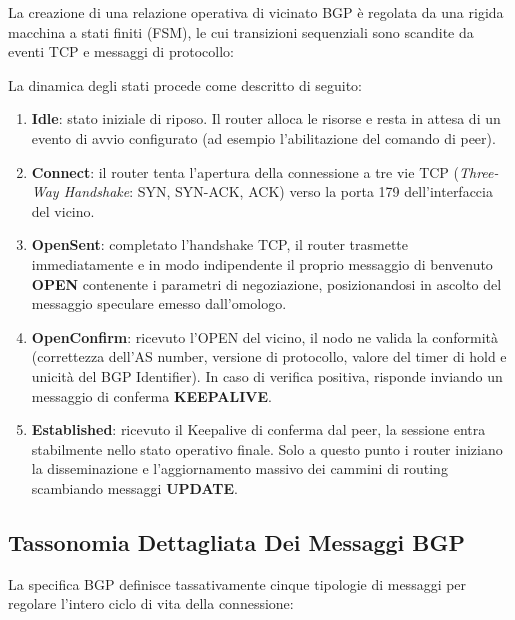\documentclass[11pt, a4paper]{article}
\begin{document}
La creazione di una relazione operativa di vicinato BGP è regolata da una rigida macchina a stati finiti (FSM), le cui transizioni sequenziali sono scandite da eventi TCP e messaggi di protocollo:


La dinamica degli stati procede come descritto di seguito:
\begin{enumerate}
    \item \textbf{Idle}: stato iniziale di riposo. Il router alloca le risorse e resta in attesa di un evento di avvio configurato (ad esempio l'abilitazione del comando di peer).
    \item \textbf{Connect}: il router tenta l'apertura della connessione a tre vie TCP (\emph{Three-Way Handshake}: SYN, SYN-ACK, ACK) verso la porta 179 dell'interfaccia del vicino.
    \item \textbf{OpenSent}: completato l'handshake TCP, il router trasmette immediatamente e in modo indipendente il proprio messaggio di benvenuto \textbf{OPEN} contenente i parametri di negoziazione, posizionandosi in ascolto del messaggio speculare emesso dall'omologo.
    \item \textbf{OpenConfirm}: ricevuto l'OPEN del vicino, il nodo ne valida la conformità (correttezza dell'AS number, versione di protocollo, valore del timer di hold e unicità del BGP Identifier). In caso di verifica positiva, risponde inviando un messaggio di conferma \textbf{KEEPALIVE}.
    \item \textbf{Established}: ricevuto il Keepalive di conferma dal peer, la sessione entra stabilmente nello stato operativo finale. Solo a questo punto i router iniziano la disseminazione e l'aggiornamento massivo dei cammini di routing scambiando messaggi \textbf{UPDATE}.
\end{enumerate}

\subsection{Tassonomia Dettagliata Dei Messaggi BGP}

La specifica BGP definisce tassativamente cinque tipologie di messaggi per regolare l'intero ciclo di vita della connessione:
\end{document}
